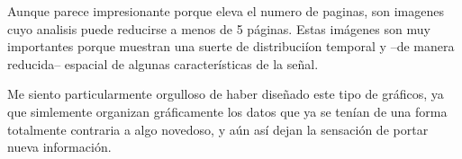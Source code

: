 \documentclass[12pt,a4paper]{mitthesis}
\begin{document}
Aunque parece impresionante porque eleva el numero de paginas, son imagenes cuyo analisis puede 
reducirse a menos de 5 p\'aginas. Estas im\'agenes son muy importantes
porque muestran una suerte de distribuci\'ion temporal y --de manera reducida-- espacial 
de algunas caracter\'isticas de la se\~nal. 

Me siento particularmente orgulloso
de haber dise\~nado este tipo de gr\'aficos, ya que 
simlemente organizan
gr\'aficamente los datos que ya se ten\'ian de una forma
totalmente contraria a algo novedoso,
y a\'un as\'i dejan la sensaci\'on de portar nueva informaci\'on.

%


{}
%


\end{document}
